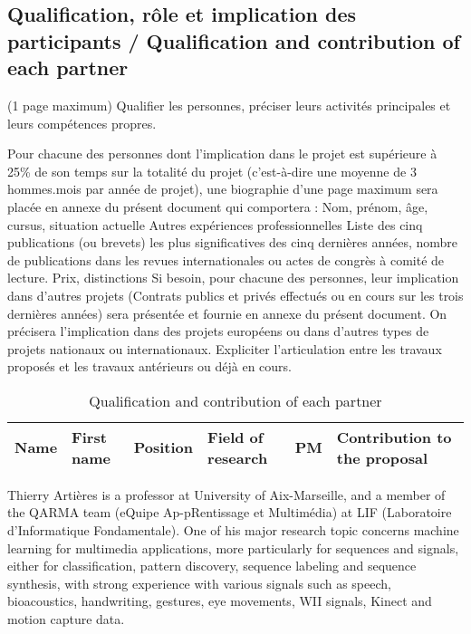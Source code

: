\subsection{Qualification, rôle et implication des participants / Qualification and contribution of each partner}
\begin{xcomment}  
(1 page maximum)
Qualifier les personnes, pr\'eciser leurs activit\'es principales  et leurs comp\'etences propres.

Pour chacune des personnes dont l'implication dans le projet est sup\'erieure à 25\% de son temps sur la totalit\'e du projet (c'est-à-dire une moyenne de 3 hommes.mois par ann\'ee de projet), une biographie d'une page maximum sera plac\'ee en annexe du pr\'esent document qui comportera :
Nom, pr\'enom, âge, cursus, situation actuelle
Autres exp\'eriences professionnelles
Liste des cinq publications (ou brevets) les plus significatives des cinq derni\`eres ann\'ees, nombre de publications dans les revues internationales ou actes de congr\`es à comit\'e de lecture.
Prix, distinctions
Si besoin, pour chacune des personnes, leur implication dans d'autres projets (Contrats publics et priv\'es effectu\'es ou en cours sur les trois derni\`eres ann\'ees) sera pr\'esent\'ee et fournie en annexe du pr\'esent document. On pr\'ecisera l'implication dans des projets europ\'eens ou dans d'autres types de projets nationaux ou internationaux. Expliciter l'articulation entre les travaux propos\'es et les travaux ant\'erieurs ou d\'ejà en cours.

\end{xcomment}
\begin{table}
\begin{tabularx}{ \textwidth}{| p{2cm} | p{2cm} |  p{2cm} |  p{2cm} |  p{1cm} |  X |    }
\hline
Name & First name & Position & Field of research & PM & Contribution to the proposal \\
\hline
\end{tabularx}

\caption{Qualification and contribution of each partner}
\end{table}

Thierry Arti\`eres  is a professor at University of Aix-Marseille, and a member of the QARMA team (eQuipe Ap-pRentissage et Multim\'edia) at LIF (Laboratoire d'Informatique Fondamentale). One of his major research topic concerns machine learning for multimedia applications, more particularly for sequences and signals, either for classification, pattern discovery, sequence labeling and sequence synthesis, with strong experience with various signals such as speech, bioacoustics, handwriting, gestures, eye movements, WII signals, Kinect and motion capture data. 

